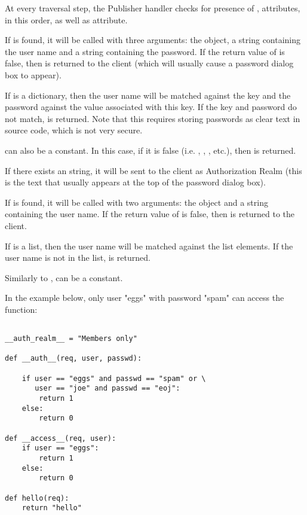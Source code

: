 At every traversal step, the Publisher handler checks for presence of
,  attributes, in this order, as 
well as  attribute. 

If  is found, it will be called with three arguments:
the  object, a string containing the user name and a
string containing the password. If the return value of
 is false, then  is
returned to the client (which will usually cause a password dialog box
to appear).

If  is a dictionary, then the user name will be
matched against the key and the password against the value associated
with this key. If the key and password do not match, 
 is returned. Note that this requires
storing passwords as clear text in source code, which is not very secure.

 can also be a constant. In this case, if it is false
(i.e. , , , etc.), then 
 is returned.

If there exists an  string, it will be sent
to the client as Authorization Realm (this is the text that usually
appears at the top of the password dialog box).

If  is found, it will be called with two arguments:
the  object and a string containing the user name. If
the return value of  is false, then
 is returned to the client.

If  is a list, then the user name will be matched
against the list elements. If the user name is not in the list, 
 is returned.

Similarly to ,  can be a constant.

In the example below, only user "eggs" with password "spam" can access
the  function:

\begin{verbatim}

__auth_realm__ = "Members only"

def __auth__(req, user, passwd):

    if user == "eggs" and passwd == "spam" or \
       user == "joe" and passwd == "eoj":
        return 1
    else:
        return 0

def __access__(req, user):
    if user == "eggs":
        return 1
    else:
        return 0

def hello(req):
    return "hello"

\end{verbatim}

